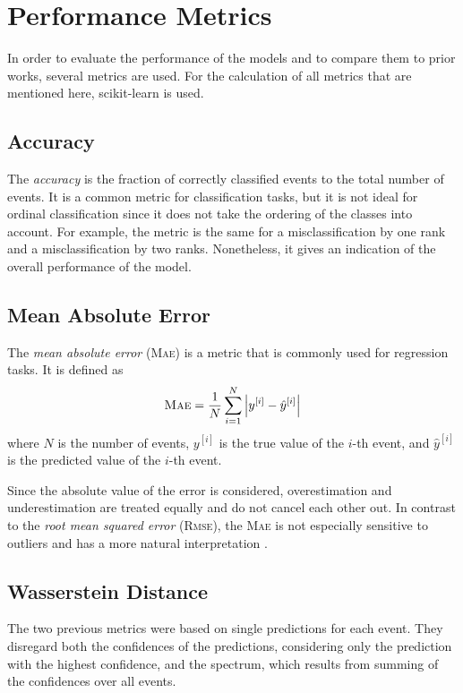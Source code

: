\section{Performance Metrics}
In order to evaluate the performance of the models
and to compare them to prior works,
several metrics are used.
%
For the calculation of all metrics that are mentioned here,
scikit-learn \cite{sklearn} is used.


\subsection{Accuracy} \label{sec:unfolding:metrics:accuracy}
The \emph{accuracy} \cite{accuracy} is the fraction of correctly classified events to the total number of events.
It is a common metric for classification tasks,
but it is not ideal for ordinal classification
  since it does not take the ordering of the classes into account.
For example,
the metric is the same for
a misclassification by one rank
and a misclassification by two ranks.
%
Nonetheless,
it gives an indication of the overall performance of the model.


\subsection{Mean Absolute Error} \label{sec:unfolding:metrics:mae}
The \emph{mean absolute error} (\textsc{Mae}) \cite{mae} is a metric that is commonly used for regression tasks. %
It is defined as
\begin{equation}
  \text{\textsc{Mae}} = \frac{1}{N} \sum_{i=1}^N \left| y^{[i]} - \hat{y}^{[i]} \right|
\end{equation}
where $N$ is the number of events,
$y^{[i]}$ is the true value of the $i$-th event,
and $\hat{y}^{[i]}$ is the predicted value of the $i$-th event. %


Since the absolute value of the error is considered,
overestimation and underestimation are treated equally
and do not cancel each other out.
In contrast to the \emph{root mean squared error} (\textsc{Rmse}),
the \textsc{Mae} is not especially sensitive to outliers
and has a more natural interpretation \cite{mae}.


\subsection{Wasserstein Distance} \label{sec:unfolding:metrics:wd}
The two previous metrics were based on single predictions for each event.
They disregard both
  the confidences of the predictions,
    considering only the prediction with the highest confidence,
  and the spectrum,
    which results from summing of the confidences over all events.

